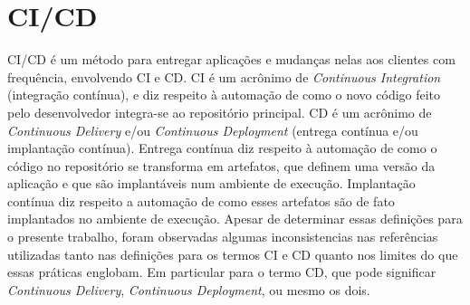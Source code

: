 

    




\section{CI/CD}\label{secao-cicd}
CI/CD é um método para entregar aplicações e mudanças nelas aos clientes com frequência, envolvendo CI e CD. CI é um acrônimo de \emph{Continuous Integration} (integração contínua), e diz respeito à automação de como o novo código feito pelo desenvolvedor integra-se ao repositório principal. CD é um acrônimo de \emph{Continuous Delivery} e/ou \emph{Continuous Deployment} (entrega contínua e/ou implantação contínua). Entrega contínua diz respeito à automação de como o código no repositório se transforma em artefatos, que definem uma versão da aplicação e que são implantáveis num ambiente de execução. Implantação contínua diz respeito a automação de como esses artefatos são de fato implantados no ambiente de execução. Apesar de determinar essas definições para o presente trabalho, foram observadas algumas inconsistencias nas referências utilizadas tanto nas definições para os termos CI e CD quanto nos limites do que essas práticas englobam. Em particular para o termo CD, que pode significar \emph{Continuous Delivery}, \emph{Continuous Deployment}, ou mesmo os dois. \cite{harness-ci-cd,redhat-ci-cd}

